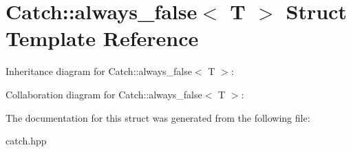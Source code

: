 \hypertarget{structCatch_1_1always__false}{}\section{Catch\+:\+:always\+\_\+false$<$ T $>$ Struct Template Reference}
\label{structCatch_1_1always__false}


Inheritance diagram for Catch\+:\+:always\+\_\+false$<$ T $>$\+:


Collaboration diagram for Catch\+:\+:always\+\_\+false$<$ T $>$\+:


The documentation for this struct was generated from the following file\+:\begin{DoxyCompactItemize}
\item 
catch.\+hpp\end{DoxyCompactItemize}
